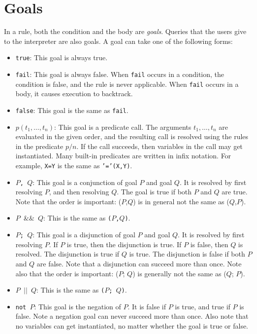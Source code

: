\section{Goals}
In a rule, both the condition and the body are \emph{goals}. Queries that the users give to the interpreter are also goals. A goal can take one of the following forms:
\begin{itemize}
\item \texttt{true}: This goal is always true.
\item \texttt{fail}: This goal is always false. When \texttt{fail} occurs in a condition, the condition is false, and the rule is never applicable. When \texttt{fail} occurs in a body, it causes execution to backtrack.
\item \texttt{false}: This goal is the same as \texttt{fail}.
\item $p(t_1, \ldots, t_n)$: This goal is a predicate call. The arguments $t_1, \ldots, t_n$ are evaluated in the given order, and the resulting call is resolved using the rules in the predicate $p/n$. If the call succeeds, then variables in the call may get instantiated. Many built-in predicates are written in infix notation. For example, \texttt{X=Y} is the same as \texttt{'='(X,Y)}.
\item \texttt{$P$, $Q$}: This goal is a conjunction of goal $P$ and goal $Q$. It is resolved by first resolving $P$, and then resolving $Q$. The goal is true if both $P$ and $Q$ are true. Note that the order is important: ($P$,$Q$) is in general not the same as ($Q$,$P$).
\item \texttt{$P$ $\&\&$ $Q$}: This is the same as \texttt{($P$,$Q$)}. 
\item \texttt{$P$; $Q$}: This goal is a disjunction of goal $P$ and goal $Q$. It is resolved by first resolving $P$. If $P$ is true, then the disjunction is true. If $P$ is false, then $Q$ is resolved. The disjunction is true if $Q$ is true. The disjunction is false if both $P$ and $Q$ are false. Note that a disjunction can succeed more than once. Note also that the order is important: ($P$; $Q$) is generally not the same as ($Q$; $P$).
\item \texttt{$P$ $|$$|$ $Q$}: This is the same as \texttt{($P$; $Q$)}.
\item \texttt{not $P$}: This goal is the negation of $P$. It is false if $P$ is true, and true if $P$ is false.  Note a negation goal can never succeed more than once.  Also note that no variables can get instantiated, no matter whether the goal is true or false.

\end{itemize}
